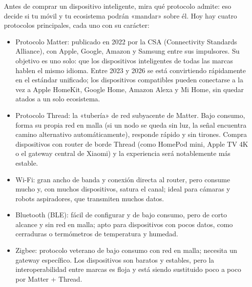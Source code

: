 


Antes de comprar un dispositivo inteligente, mira qué protocolo admite: eso decide si tu móvil y tu ecosistema podrán «mandar» sobre él. Hoy hay cuatro protocolos principales, cada uno con su carácter:

\begin{itemize}
  \item Protocolo Matter: publicado en 2022 por la CSA (Connectivity Standards Alliance), con Apple, Google, Amazon y Samsung entre sus impulsores. Su objetivo es uno solo: que los dispositivos inteligentes de todas las marcas hablen el mismo idioma. Entre 2023 y 2026 se está convirtiendo rápidamente en el estándar unificado; los dispositivos compatibles pueden conectarse a la vez a Apple HomeKit, Google Home, Amazon Alexa y Mi Home, sin quedar atados a un solo ecosistema.
  \item Protocolo Thread: la «tubería» de red subyacente de Matter. Bajo consumo, forma su propia red en malla (si un nodo se queda sin luz, la señal encuentra camino alternativo automáticamente), responde rápido y sin tirones. Compra dispositivos con router de borde Thread (como HomePod mini, Apple TV 4K o el gateway central de Xiaomi) y la experiencia será notablemente más estable.
  \item Wi-Fi: gran ancho de banda y conexión directa al router, pero consume mucho y, con muchos dispositivos, satura el canal; ideal para cámaras y robots aspiradores, que transmiten muchos datos.
  \item Bluetooth (BLE): fácil de configurar y de bajo consumo, pero de corto alcance y sin red en malla; apto para dispositivos con pocos datos, como cerraduras o termómetros de temperatura y humedad.
  \item Zigbee: protocolo veterano de bajo consumo con red en malla; necesita un gateway específico. Los dispositivos son baratos y estables, pero la interoperabilidad entre marcas es floja y está siendo sustituido poco a poco por Matter + Thread.
\end{itemize}

